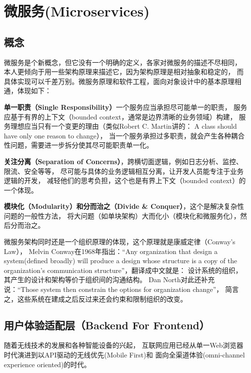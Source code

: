 \documentclass{book}
\begin{document}
\section{微服务(Microservices)}

\subsection{概念}

微服务是个新概念，但它没有一个明确的定义，各家对微服务的描述不尽相同，
本人更倾向于用一些架构原理来描述它，因为架构原理是相对抽象和稳定的，
而具体实现可以千差万别。微服务原理和软件工程，面向对象设计中的基本原理相通，体现如下：

\textbf{单一职责（Single Responsibility）}一个服务应当承担尽可能单一的职责，
服务应基于有界的上下文（bounded context，通常是边界清晰的业务领域）构建，
服务理想应当只有一个变更的理由（类似Robert C. Martin讲的：
A class should have only one reason to change），
当一个服务承担过多职责，就会产生各种耦合性问题，需要进一步拆分使其尽可能职责单一化。

\textbf{关注分离（Separation of Concerns）}，跨横切面逻辑，例如日志分析、监控、限流、安全等等，
尽可能与具体的业务逻辑相互分离，让开发人员能专注于业务逻辑的开发，
减轻他们的思考负担，这个也是有界上下文（bounded context）的一个体现。

\textbf{模块化（Modularity）和分而治之（Divide \& Conquer）}，这个是解决复杂性问题的一般性方法，
将大问题（如单块架构）大而化小（模块化和微服务化），然后分而治之。

微服务架构同时还是一个组织原理的体现，这个原理就是康威定律（Conway’s Law），
Melvin Conway在1968年指出：“Any organization that design a 
system(defined broadly) will produce a design whose structure is a copy of the organization’s communication structure”，翻译成中文就是：
设计系统的组织，其产生的设计和架构等价于组织间的沟通结构。
Dan North对此还补充说：“Those system then constrain the options for organization change”，
简言之，这些系统在建成之后反过来还会约束和限制组织的改变。

\subsection{用户体验适配层（Backend For Frontend）}

随着无线技术的发展和各种智能设备的兴起，
互联网应用已经从单一Web浏览器时代演进到以API驱动的无线优先(Mobile First)和
面向全渠道体验(omni-channel experience oriented)的时代。
\end{document}
